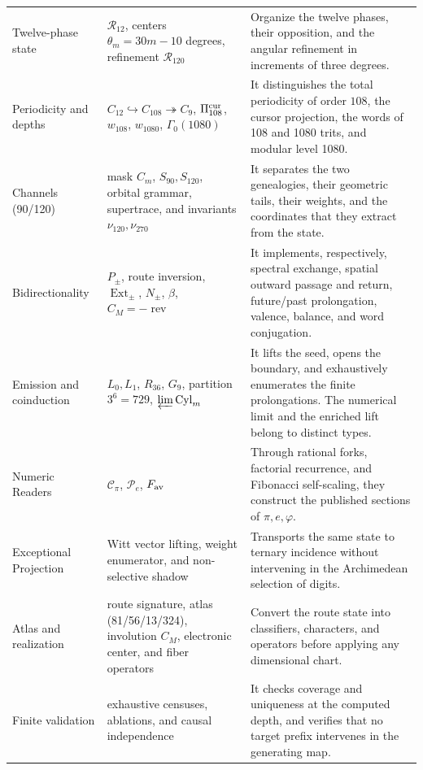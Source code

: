 \begin{longtable}{@{}p{}p{}p{}@{}}
Twelve-phase state &
\(\mathcal R_{12}\), centers \(\theta_m=30m-10\) degrees,
refinement \(\mathcal R_{120}\) &
Organize the twelve phases, their opposition, and the angular refinement in increments of
three degrees. \\

Periodicity and depths &
\(C_{12}\hookrightarrow C_{108}\twoheadrightarrow C_9\),
\(\Pi_{108}^{\rm cur}\), \(w_{108}\), \(w_{1080}\),
\(\Gamma_0(1080)\) &
It distinguishes the total periodicity of order \(108\), the cursor projection, the
words of 108 and 1080 trits, and modular level 1080. \\

Channels (90/120) &
mask \(C_m\), \(S_{90},S_{120}\), orbital grammar,
supertrace, and invariants \(\nu_{120},\nu_{270}\) &
It separates the two genealogies, their geometric tails, their weights, and the
coordinates that they extract from the state. \\

Bidirectionality &
\(P_\pm\), route inversion, \(\operatorname{Ext}_\pm\),
\(N_\pm\), \(\beta\), \(C_M=-\operatorname{rev}\) &
It implements, respectively, spectral exchange, spatial outward passage and return,
future/past prolongation, valence, balance, and word conjugation. \\

Emission and coinduction &
\(L_0,L_1\), \(R_{36}\), \(G_9\), partition \(3^6=729\),
\(\varprojlim\operatorname{Cyl}_m\) &
It lifts the seed, opens the boundary, and exhaustively enumerates the
finite prolongations. The numerical limit and the enriched lift
belong to distinct types. \\

Numeric Readers &
\(\mathscr C_\pi\), \(\mathscr P_e\), \(F_{\rm av}\) &
Through rational forks, factorial recurrence, and Fibonacci
self-scaling, they construct the published sections of \(\pi,e,\varphi\). \\

Exceptional Projection &
Witt vector lifting, weight enumerator, and non-selective shadow &
Transports the same state to ternary incidence without intervening in the Archimedean selection of digits. \\

Atlas and realization &
route signature, atlas (81/56/13/324), involution \(C_M\), electronic
center, and fiber operators &
Convert the route state into classifiers, characters, and operators before
applying any dimensional chart. \\

Finite validation &
exhaustive censuses, ablations, and causal independence &
It checks coverage and uniqueness at the computed depth, and verifies that
no target prefix intervenes in the generating map. \\
\bottomrule
\end{longtable}
\endgroup

